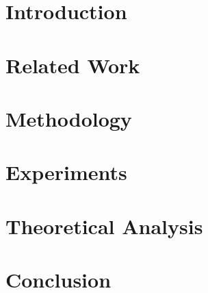 \documentclass[letterpaper]{article}
\begin{document}
\section{Introduction}
\label{sec:introduction}


\section{Related Work}
\label{sec:related_work}


\section{Methodology}
\label{sec:methodology}


\section{Experiments}
\label{sec:experiments}


\section{Theoretical Analysis}
\label{sec:theoretical_analysis}


\section{Conclusion}
\label{sec:conclusion}




\end{document}
